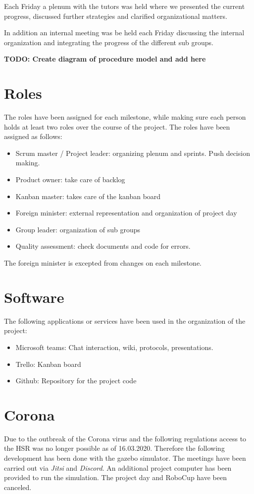 \documentclass[main.tex]{subfiles}
\begin{document}
	Each Friday a plenum with the tutors was held where we presented the current progress, discussed further strategies and clarified organizational matters.
	
	In addition an internal meeting was be held each Friday discussing the internal organization and integrating the progress of the different sub groups.
	
	\textbf{TODO: Create diagram of procedure model and add here}

	\section{Roles}
	The roles have been assigned for each milestone, while making sure each person holds at least two roles over the course of the project. The roles have been assigned as follows:
	\begin{itemize}
		\item Scrum master / Project leader: organizing plenum and sprints. Push decision making.
		\item Product owner: take care of backlog
		\item Kanban master: takes care of the kanban board
		\item Foreign minister: external representation and organization of project day
		\item Group leader: organization of sub groups
		\item Quality assessment: check documents and code for errors.
	\end{itemize}

	The foreign minister is excepted from changes on each milestone.
	
	\section{Software}
	The following applications or services have been used in the organization of the project:
	\begin{itemize}
		\item Microsoft teams: Chat interaction, wiki, protocols, presentations.
		\item Trello: Kanban board
		\item Github: Repository for the project code
	\end{itemize}  

	\section{Corona}
	Due to the outbreak of the Corona virus and the following regulations access to the HSR was no longer possible as of 16.03.2020. Therefore the following development has been done with the gazebo simulator.
	The meetings have been carried out via \textit{Jitsi} and \textit{Discord}. An additional project computer has been provided to run the simulation.
	The project day and RoboCup have been canceled.
	
\end{document}
